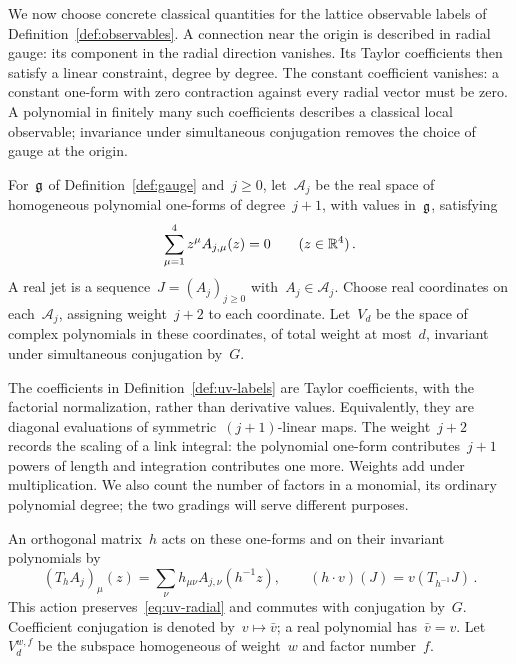 We now choose concrete classical quantities for the lattice observable labels of Definition~\ref{def:observables}.
A connection near the origin is described in radial gauge: its component in the radial direction vanishes.
Its Taylor coefficients then satisfy a linear constraint, degree by degree.
The constant coefficient vanishes: a constant one-form with zero contraction against every radial vector must be zero.
A polynomial in finitely many such coefficients describes a classical local observable; invariance under simultaneous conjugation removes the choice of gauge at the origin.

\begin{definition}\label{def:uv-labels}
For~$\mathfrak g$ of Definition~\ref{def:gauge} and~$j\ge0$, let~$\mathcal A_j$ be the real space of homogeneous polynomial one-forms of degree~$j+1$, with values in~$\mathfrak g$, satisfying
\begin{equation}\label{eq:uv-radial}
 \sum_{\mu=1}^4 z^\mu A_{j,\mu}(z)=0\qquad(z\in\mathbb R^4)\,.
\end{equation}
A real jet is a sequence~$J=(A_j)_{j\ge0}$ with~$A_j\in\mathcal A_j$.
Choose real coordinates on each~$\mathcal A_j$, assigning weight~$j+2$ to each coordinate.
Let~$V_d$ be the space of complex polynomials in these coordinates, of total weight at most~$d$, invariant under simultaneous conjugation by~$G$.
\end{definition}

The coefficients in Definition~\ref{def:uv-labels} are Taylor coefficients, with the factorial normalization, rather than derivative values.
Equivalently, they are diagonal evaluations of symmetric~$(j+1)$-linear maps.
The weight~$j+2$ records the scaling of a link integral: the polynomial one-form contributes~$j+1$ powers of length and integration contributes one more.
Weights add under multiplication.
We also count the number of factors in a monomial, its ordinary polynomial degree; the two gradings will serve different purposes.

An orthogonal matrix~$h$ acts on these one-forms and on their invariant polynomials by
\begin{equation}\label{eq:uv-label-action}
 (T_hA_j)_\mu(z)=\sum_\nu h_{\mu\nu}A_{j,\nu}(h^{-1}z),
 \qquad (h\cdot v)(J)=v(T_{h^{-1}}J)\,.
\end{equation}
This action preserves~\eqref{eq:uv-radial} and commutes with conjugation by~$G$.
Coefficient conjugation is denoted by~$v\mapsto\bar v$; a real polynomial has~$\bar v=v$.
Let~$V_d^{w,f}$ be the subspace homogeneous of weight~$w$ and factor number~$f$.

